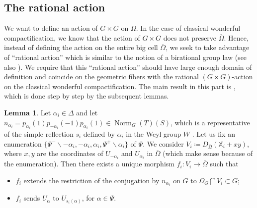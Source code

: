 \documentclass[11pt, reqno]{amsart}
\theoremstyle{plain}
\theoremstyle{definition}
\newtheorem{lemma}[theorem]{Lemma}
\DeclareMathOperator{\Norm}{Norm}	%
\begin{document}
\subsection{The rational action}
We want to define an action of $G\times G$ on $\overline{\Omega}$. In the case of classical wonderful compactification, we know that the action of $G\times G$ does not preserve $\overline{\Omega}$. Hence, instead of defining the action on the entire big cell $\overline{\Omega}$, we seek to take advantage of ``rational action'' which is similar to the notion of a birational group law \cite[exposé~XVIII, définition ~3.1]{SGA3II} (see also \cite[Chapter~4]{BLR}). We require that this ``rational action'' should have large enough domain of definition and coincide on the geometric fibers with the rational $(G\times G)$-action on the classical wonderful compactification. The main result in this part is , which is done step by step  by the subsequent lemmas.

\begin{lemma}\label{singlereflectrational}
    Let $\alpha_i\in \Delta$ and let $n_{\alpha_i}=p_{\alpha_i}(1)p_{-{\alpha_i}}(-1)p_{\alpha_i}(1)\in \Norm_G(T)(S)$, which is a representative of the simple reflection $s_i$ defined by $\alpha_i$ in the Weyl group $W$ \cite[exposé~XXII, 3.3]{SGA3III}. Let us fix an enumeration $\{\Psi^-\backslash -\alpha_i, -\alpha_i,\alpha_i, \Psi^+\backslash \alpha_i\}$ of $\Psi$. We consider $V_i\coloneq D_{\overline{\Omega}}(\mathbb{X}_i+xy)$, where $x,y$ are the coordinates of $U_{-\alpha_i}$ and $U_{\alpha_{i}}$ in $\overline{\Omega}$ (which make sense because of the enumeration).  Then there exists a unique morphism $f_i\colon V_i\longrightarrow  \overline{\Omega}$  such that
    \begin{itemize}
        \item[(1)] $f_i$ extends the restriction of the conjugation by $n_{\alpha_i}$ on $G$ to $\Omega_G\bigcap V_i\subset G$;
        \item[(2)] $f_i$ sends $U_{\alpha}$ to $U_{s_i(\alpha)}$, for $\alpha\in\Psi$.
    \end{itemize}
    
   
\end{lemma}
\end{document}
